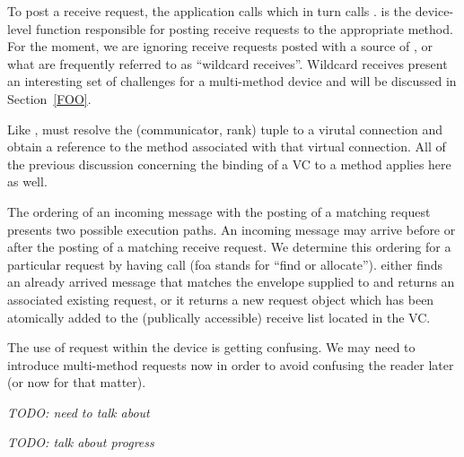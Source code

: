 To post a receive request, the application calls  which in
turn calls .   is the device-level
function responsible for posting receive requests to the appropriate method.
For the moment, we are ignoring receive requests posted with a source of
, or what are frequently referred to as ``wildcard
receives''.  Wildcard receives present an interesting set of challenges for a
multi-method device and will be discussed in Section~\ref{FOO}.

Like ,  must resolve the (communicator, rank)
tuple to a virutal connection and obtain a reference to the method associated
with that virtual connection.  All of the previous discussion concerning the
binding of a VC to a method applies here as well.

The ordering of an incoming message with the posting of a matching request
presents two possible execution paths.  An incoming message may arrive before
or after the posting of a matching receive request.  We determine this ordering
for a particular request by having  call
 (foa stands for ``find or allocate'').
 either finds an already arrived message that matches
the envelope supplied to  and returns an associated existing
request, or it returns a new request object which has been atomically added to
the (publically accessible) receive list located in the VC.

\begin{cmt}
  The use of request within the device is getting confusing.  We may need to
  introduce multi-method requests now in order to avoid confusing the reader
  later (or now for that matter).
\end{cmt}

\emph{TODO: need to talk about }


\emph{TODO: talk about progress}


